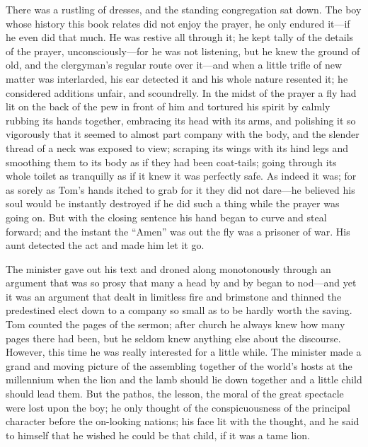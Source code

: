 \documentclass{book}
\begin{document}
There was a rustling of dresses, and the standing congregation sat down. The boy whose history this book relates did not enjoy the prayer, he only endured it—if he even did that much. He was restive all through it; he kept tally of the details of the prayer, unconsciously—for he was not listening, but he knew the ground of old, and the clergyman’s regular route over it—and when a little trifle of new matter was interlarded, his ear detected it and his whole nature resented it; he considered additions unfair, and scoundrelly. In the midst of the prayer a fly had lit on the back of the pew in front of him and tortured his spirit by calmly rubbing its hands together, embracing its head with its arms, and polishing it so vigorously that it seemed to almost part company with the body, and the slender thread of a neck was exposed to view; scraping its wings with its hind legs and smoothing them to its body as if they had been coat-tails; going through its whole toilet as tranquilly as if it knew it was perfectly safe. As indeed it was; for as sorely as Tom’s hands itched to grab for it they did not dare—he believed his soul would be instantly destroyed if he did such a thing while the prayer was going on. But with the closing sentence his hand began to curve and steal forward; and the instant the “Amen” was out the fly was a prisoner of war. His aunt detected the act and made him let it go.

The minister gave out his text and droned along monotonously through an argument that was so prosy that many a head by and by began to nod—and yet it was an argument that dealt in limitless fire and brimstone and thinned the predestined elect down to a company so small as to be hardly worth the saving. Tom counted the pages of the sermon; after church he always knew how many pages there had been, but he seldom knew anything else about the discourse. However, this time he was really interested for a little while. The minister made a grand and moving picture of the assembling together of the world’s hosts at the millennium when the lion and the lamb should lie down together and a little child should lead them. But the pathos, the lesson, the moral of the great spectacle were lost upon the boy; he only thought of the conspicuousness of the principal character before the on-looking nations; his face lit with the thought, and he said to himself that he wished he could be that child, if it was a tame lion.
\end{document}
